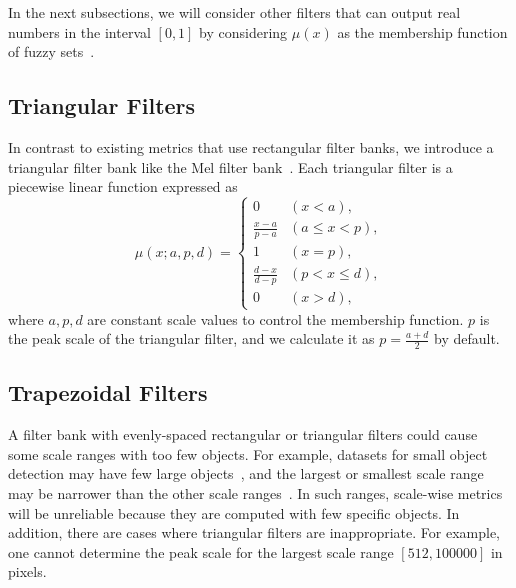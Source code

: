 \documentclass{mva_style}
\begin{document}
In the next subsections,
we will consider other filters that can output real numbers in the interval $[0, 1]$
by considering $\mu(x)$ as the membership function of fuzzy sets~\cite{FuzzySets_Zadeh_1965}.


\subsection{Triangular Filters}

In contrast to existing metrics that use rectangular filter banks, we introduce a triangular filter bank like the Mel filter bank~\cite{MFCC_Davis_1980}.
Each triangular filter is a piecewise linear function expressed as
\begin{equation} \label{eq:triangular_filter}
	\mu(x; a, p, d) =
	\begin{cases}
		0                   & (x < a),        \\
		\frac{x - a}{p - a} & (a \leq x < p), \\
		1                   & (x = p),        \\
		\frac{d - x}{d - p} & (p < x \leq d), \\
		0                   & (x > d),
	\end{cases}
\end{equation}
where $a, p, d$ are constant scale values to control the membership function.
$p$ is the peak scale of the triangular filter, and we calculate it as $p = \frac{a + d}{2}$ by default.


\subsection{Trapezoidal Filters}
\label{sec:proposed_metrics_trapezoidal_filters}

A filter bank with evenly-spaced rectangular or triangular filters could cause some scale ranges with too few objects.
For example, datasets for small object detection may have few large objects~\cite{SOD4SB_MVA2023_challenge},
and the largest or smallest scale range may be narrower than the other scale ranges~\cite{USB_Shinya_BMVC2022}.
In such ranges, scale-wise metrics will be unreliable because they are computed with few specific objects.
In addition, there are cases where triangular filters are inappropriate.
For example, one cannot determine the peak scale for the largest scale range $[512, 100000]$ in pixels.
\end{document}
